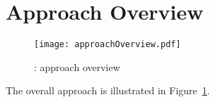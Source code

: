 \section{Approach Overview}
\label{sec:approach}



\begin{figure}[t]
\centering
\texttt{[image: approachOverview.pdf]}
\caption{\name: approach overview}
\label{fig:approachOverview}
\centering
\end{figure}

The overall approach is illustrated in Figure~\ref{fig:approachOverview}.
